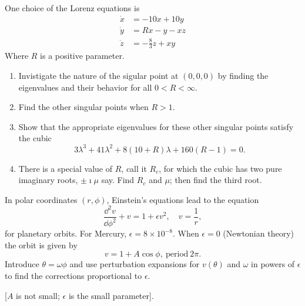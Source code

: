 \begin{Exercise}
  One choice of the Lorenz equations is
  \begin{align*}
    \dot{x} &= -10x+10y \\
    \dot{y} &= R x-y-x z \\
    \dot{z} &= -\frac{8}{3} z + x y
  \end{align*}
  Where $R$ is a positive parameter.
  \begin{enumerate}
  \item
    Invistigate the nature of the sigular point at $(0,0,0)$ by finding the
    eigenvalues and their behavior for all $0 < R < \infty$.
  \item
    Find the other singular points when $R > 1$.
  \item
    Show that the appropriate eigenvalues for these other singular points
    satisfy the cubic
    \[ 
    3\lambda^3 + 41 \lambda^2 + 8(10+R)\lambda + 160 (R-1) = 0.
    \]
  \item
    There is a special value of $R$, call it $R_c$, for which the cubic has
    two pure imaginary roots, $\pm \imath \mu$ say.  Find $R_c$ and $\mu$; then
    find the third root.
  \end{enumerate}
\end{Exercise}



\begin{Exercise}
  In polar coordinates $(r,\phi)$, Einstein's equations lead to the 
  equation
  \[ 
  \frac{\dd^2 v}{\dd \phi^2} + v = 1 + \epsilon v^2, \quad v = \frac{1}{r}, 
  \]
  for planetary orbits.  For Mercury, $\epsilon=8 \times 10^{-8}$.
  When $\epsilon=0$ (Newtonian theory) the orbit is given by
  \[ v=1+A\cos\phi, \ \mathrm{period}\ 2\pi.\]
  Introduce $\theta=\omega\phi$ and use perturbation expansions for $v(\theta)$
  and $\omega$ in powers of $\epsilon$ to find the corrections proportional
  to $\epsilon$.

  [$A$ is not small; $\epsilon$ is the small parameter].
\end{Exercise}



